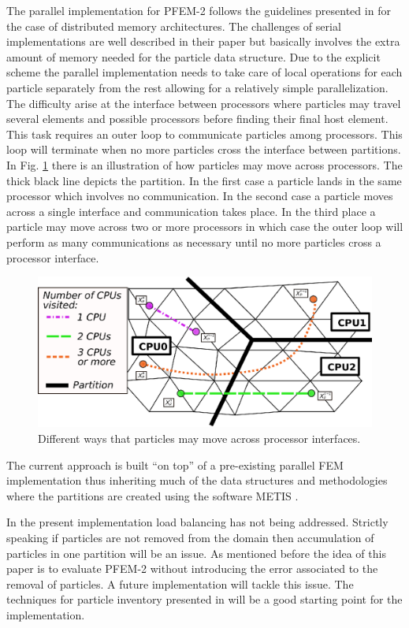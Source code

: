 The parallel implementation for PFEM-2 follows the guidelines presented in \cite{gimenez:parallel} for the case of distributed memory architectures. The challenges of serial implementations are well described in their paper but basically involves the extra amount of memory needed for the particle data structure. Due to the explicit scheme the parallel implementation needs to take care of local operations for each particle separately from the rest allowing for a relatively simple parallelization. The difficulty arise at the interface between processors where particles may travel several elements and possible processors before finding their final host element. This task requires an outer loop to communicate particles among processors. This loop will terminate when no more particles cross the interface between partitions. In Fig. \ref{fig:parallel} there is an illustration of how particles may move across processors. The thick black line depicts the partition. In the first case a particle lands in the same processor which involves no communication. In the second case a particle moves across a single interface and communication takes place. In the third place a particle may move across two or more processors in which case the outer loop will perform as many communications as necessary until no more particles cross a processor interface.
%
\begin{figure}[htp] 
\centering 
\includegraphics[scale=.6]{./imgs/parallel.eps}
\caption{Different ways that particles may move across processor interfaces.}
\label{fig:parallel}
\end{figure}
%
The current approach is built ``on top'' of a pre-existing parallel FEM implementation thus inheriting much of the data structures and methodologies where the partitions are created using the software METIS \cite{metis1,metis}.

In the present implementation load balancing has not being addressed. Strictly speaking if particles are not removed from the domain then accumulation of particles in one partition will be an issue. As mentioned before the idea of this paper is to evaluate PFEM-2 without introducing the error associated to the removal of particles. A future implementation will tackle this issue. The techniques for particle inventory presented in \cite{gimenez-difusion} will be a good starting point for the implementation.

